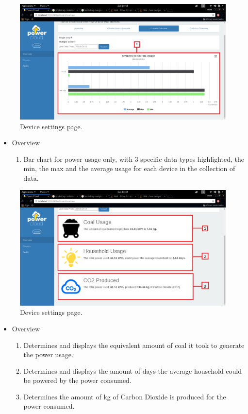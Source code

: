 \documentclass[a4paper,10pt]{article}
\begin{document}
		\begin{figure}[H]
			\includegraphics[width=\textwidth]{images/Overview_CurrentBar.png}
			\caption{Device settings page. \label{overflow}}
		\end{figure}
		\begin{itemize}
			\item Overview
			\begin{enumerate}
				\item Bar chart for power usage only, with 3 specific data types highlighted, the 
				min, the max and the average usage for each device in the collection of data.
			\end{enumerate}
		\end{itemize}
		
		\begin{figure}[H]
			\includegraphics[width=\textwidth]{images/Overview_Emissions.png}
			\caption{Device settings page. \label{overflow}}
		\end{figure}
		\begin{itemize}
			\item Overview
			\begin{enumerate}
				\item Determines and displays the equivalent amount of coal it took to generate 
				the power usage.
				\item Determines and displays the amount of days the average household could be  
				powered by the power consumed.
				\item Determines the amount of kg of Carbon Dioxide is produced for the power 
				consumed.
			\end{enumerate}
		\end{itemize}
		
\end{document}
